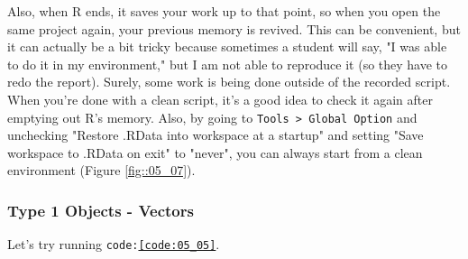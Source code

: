 \documentclass{ltjsbook}
\begin{document}
Also, when R ends, it saves your work up to that point, so when you open the same project again, your previous memory is revived. This can be convenient, but it can actually be a bit tricky because sometimes a student will say, "I was able to do it in my environment," but I am not able to reproduce it (so they have to redo the report). Surely, some work is being done outside of the recorded script. When you're done with a clean script, it's a good idea to check it again after emptying out R's memory. Also, by going to \verb|Tools > Global Option| and unchecking "Restore .RData into workspace at a startup" and setting "Save workspace to .RData on exit" to "never", you can always start from a clean environment (Figure \ref{fig::05_07}).



\subsubsection{Type 1 Objects - Vectors}
Let's try running \texttt{code:\ref{code:05_05}}.



\end{document}
